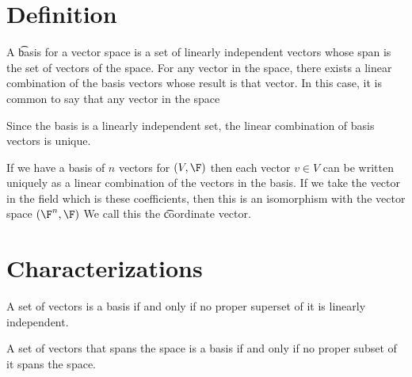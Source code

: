 
\section*{Definition}

A \t{basis for} a vector space is a set of linearly independent vectors whose span is the set of vectors of the space.
For any vector in the space, there exists a linear combination of the basis vectors whose result is that vector.
In this case, it is common to say that any vector in the space 

Since the basis is a linearly independent set, the linear combination of basis vectors is unique.

If we have a basis of $n$ vectors for $(V, \F )$ then each vector $v \in V$ can be written uniquely as a linear combination of the vectors in the basis.
If we take the vector in the field which is these coefficients, then this is an isomorphism with the vector space $(\F ^n, \F )$
We call this the \t{coordinate vector}.

\section*{Characterizations}

\begin{proposition}A set of vectors is a basis if and only if no proper superset of it is linearly independent.\end{proposition}
\begin{proposition}A set of vectors that spans the space is a basis if and only if no proper subset of it spans the space.\end{proposition}
\blankpage